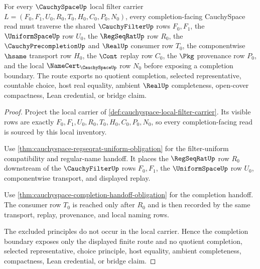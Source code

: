 \begin{theorem}
\label{thm:cauchyspace-filter-uniform-completion-nonescape}
For every $\CauchySpaceUp$ local filter carrier $L=(F_0,F_1,U_0,R_0,T_0,H_0,C_0,P_0,N_0)$, every completion-facing CauchySpace read must traverse the shared $\CauchyFilterUp$ rows $F_0,F_1$, the $\UniformSpaceUp$ row $U_0$, the $\RegSeqRatUp$ row $R_0$, the $\CauchyPrecompletionUp$ and $\RealUp$ consumer row $T_0$, the componentwise $\hsame$ transport row $H_0$, the $\Cont$ replay row $C_0$, the $\Pkg$ provenance row $P_0$, and the local $\NameCert_{\CauchySpaceUp}$ row $N_0$ before exposing a completion boundary. The route exports no quotient completion, selected representative, countable choice, host real equality, ambient $\RealUp$ completeness, open-cover compactness, Lean credential, or bridge claim.
\end{theorem}
\begin{proof}
Project the local carrier of \autoref{def:cauchyspace-local-filter-carrier}. Its visible rows are exactly $F_0,F_1,U_0,R_0,T_0,H_0,C_0,P_0,N_0$, so every completion-facing read is sourced by this local inventory.

Use \autoref{thm:cauchyspace-regseqrat-uniform-obligation} for the filter-uniform compatibility and regular-name handoff. It places the $\RegSeqRatUp$ row $R_0$ downstream of the $\CauchyFilterUp$ rows $F_0,F_1$, the $\UniformSpaceUp$ row $U_0$, componentwise transport, and displayed replay.

Use \autoref{thm:cauchyspace-completion-handoff-obligation} for the completion handoff. The consumer row $T_0$ is reached only after $R_0$ and is then recorded by the same transport, replay, provenance, and local naming rows.

The excluded principles do not occur in the local carrier. Hence the completion boundary exposes only the displayed finite route and no quotient completion, selected representative, choice principle, host equality, ambient completeness, compactness, Lean credential, or bridge claim.
\end{proof}

